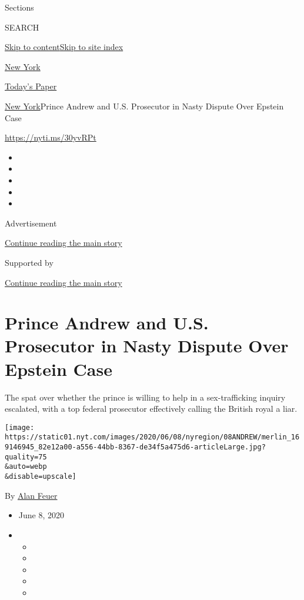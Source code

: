 Sections

SEARCH

\protect\hyperlink{site-content}{Skip to
content}\protect\hyperlink{site-index}{Skip to site index}

\href{https://www.nytimes.com/section/nyregion}{New York}

\href{https://myaccount.nytimes.com/auth/login?response_type=cookie\&client_id=vi}{}

\href{https://www.nytimes.com/section/todayspaper}{Today's Paper}

\href{/section/nyregion}{New York}\textbar{}Prince Andrew and U.S.
Prosecutor in Nasty Dispute Over Epstein Case

\url{https://nyti.ms/30yvRPt}

\begin{itemize}
\item
\item
\item
\item
\item
\end{itemize}

Advertisement

\protect\hyperlink{after-top}{Continue reading the main story}

Supported by

\protect\hyperlink{after-sponsor}{Continue reading the main story}

\hypertarget{prince-andrew-and-us-prosecutor-in-nasty-dispute-over-epstein-case}{%
\section{Prince Andrew and U.S. Prosecutor in Nasty Dispute Over Epstein
Case}\label{prince-andrew-and-us-prosecutor-in-nasty-dispute-over-epstein-case}}

The spat over whether the prince is willing to help in a sex-trafficking
inquiry escalated, with a top federal prosecutor effectively calling the
British royal a liar.

\texttt{[image: https://static01.nyt.com/images/2020/06/08/nyregion/08ANDREW/merlin\_169146945\_82e12a00-a556-44bb-8367-de34f5a475d6-articleLarge.jpg?quality=75\\\&auto=webp\\\&disable=upscale]}

By \href{https://www.nytimes.com/by/alan-feuer}{Alan Feuer}

\begin{itemize}
\item
  June 8, 2020
\item
  \begin{itemize}
  \item
  \item
  \item
  \item
  \item
  \end{itemize}
\end{itemize}


